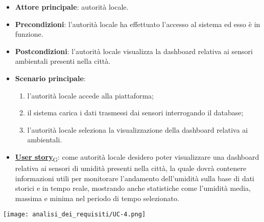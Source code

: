 \begin{itemize}
	\item \textbf{Attore principale}: autorità locale.
	\item \textbf{Precondizioni}: l'autorità locale ha effettuato l'accesso al sistema ed esso è in funzione.
	\item \textbf{Postcondizioni}: l'autorità locale visualizza la dashboard relativa
	      ai sensori ambientali presenti nella città.
	\item \textbf{Scenario principale}:
	      \begin{enumerate}
		      \item l'autorità locale accede alla piattaforma;
		      \item il sistema carica i dati trasmessi dai sensori interrogando il database;
		      \item l'autorità locale seleziona la visualizzazione della dashboard relativa ai ambientali.
	      \end{enumerate}
	\item \href{https://7last.github.io/docs/rtb/documentazione-interna/glossario\#user-story}{\textbf{User story}\textsubscript{G}}:
	      come autorità locale desidero poter visualizzare una dashboard relativa ai sensori di umidità presenti nella città, la quale
	      dovrà contenere informazioni utili per monitorare l'andamento dell'umidità sulla base di dati storici e in tempo reale, mostrando
	      anche statistiche come l'umidità media, massima e minima nel periodo di tempo selezionato.
\end{itemize}
\begin{center}
	\texttt{[image: analisi\_dei\_requisiti/UC-4.png]}
\end{center}


